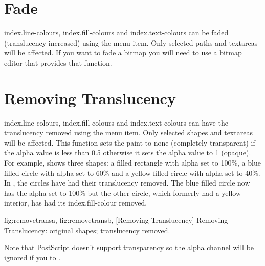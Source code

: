 
\section{Fade}\label{sec:fade}


\Glspl{index.line-colour}, \glspl{index.fill-colour} and
\glspl{index.text-colour} can be faded (\gls{translucency} increased)
using the  menu item. Only selected
\glspl{path} and \glspl{textarea} will be affected. If you want to
fade a \gls{bitmap} you will need to use a bitmap editor that
provides that function.


\section{Removing Translucency}\label{sec:removetranslucency}


\Glspl{index.line-colour}, \glspl{index.fill-colour} and
\glspl{index.text-colour} can have the \gls{translucency} removed using
the  menu item. Only selected
\glspl{shape} and \glspl{textarea} will be affected. This function
sets the paint to none (completely \gls{transparent}) if the alpha value
is less than 0.5 otherwise it sets the alpha value to 1 (opaque).
For example,  shows three shapes: a
filled rectangle with alpha set to 100\%, a blue filled circle with
alpha set to 60\% and a yellow filled circle with alpha set to 40\%.
In , the circles have had their
translucency removed. The blue filled circle now has the alpha set
to 100\% but the other circle, which formerly had a yellow interior,
has had its \gls{index.fill-colour} removed.

{
 {fig:removetransa}{}{},
 {fig:removetransb}{}{},
}
[Removing Translucency]
{Removing Translucency:  original shapes;
   translucency removed.}

\begin{warning}
Note that PostScript doesn't support transparency so the
alpha channel will be ignored if you  to .
\end{warning}

